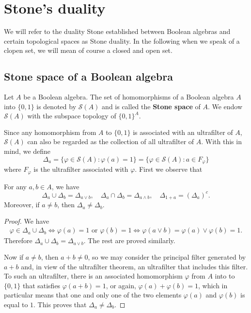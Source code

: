 \section{Stone's duality}
We will refer to the duality Stone established between Boolean algebras and certain topological spaces as Stone duality. In the following when we speak of a clopen
set, we will mean of course a closed and open set.
\subsection{Stone space of a Boolean algebra}
\begin{definition}
Let $A$ be a Boolean algebra. The set of homomorphisms of a Boolean algebra $A$ into $\{0,1\}$ is denoted 
by $\mathcal{S}(A)$ and is called the \textbf{Stone space} of $A$. We endow $\mathcal{S}(A)$ with the subspace topology of $\{0,1\}^A$.
\end{definition}
Since any homomorphism from $A$ to $\{0,1\}$ is associated with an ultrafilter of $A$, $\mathcal{S}(A)$ can also be regarded as the collection of all ultrafilter of $A$. With this in mind, we define
\[\Delta_a=\{\varphi\in\mathcal{S}(A):\varphi(a)=1\}=\{\varphi\in\mathcal{S}(A):a\in F_\varphi\}\]
where $F_\varphi$ is the ultrafilter associated with $\varphi$. First we observe that
\begin{lemma}\label{Bool ring delta_a}
For any $a,b\in A$, we have
\[\Delta_a\cup\Delta_b=\Delta_{a\vee b},\quad \Delta_a\cap\Delta_b=\Delta_{a\wedge b},\quad \Delta_{1+a}=(\Delta_a)^c.\]
Moreover, if $a\neq b$, then $\Delta_a\neq\Delta_b$.
\end{lemma}
\begin{proof}
We have
\begin{align*}
\varphi\in\Delta_a\cup\Delta_{b}\iff \varphi(a)=1\text{ or }\varphi(b)=1\iff\varphi(a\vee b)=\varphi(a)\vee\varphi(b)=1.
\end{align*}
Therefore $\Delta_{a}\cup\Delta_b=\Delta_{a\vee b}$. The rest are proved similarly.\par
Now if $a\neq b$, then $a+b\neq 0$, so we may consider the principal filter generated by $a+b$ and, in view of the ultrafilter theorem, 
an ultrafilter that includes this filter. To such an ultrafilter, there is an associated homomorphism $\varphi$ from $A$ into to $\{0,1\}$ 
that satisfies $\varphi(a+b)=1$, or again, $\varphi(a)+\varphi(b)=1$, which in particular means that one and only one of the two elements
$\varphi(a)$ and $\varphi(b)$ is equal to $1$. This proves that $\Delta_a\neq\Delta_b$.
\end{proof}
